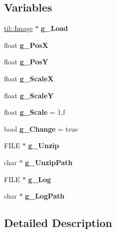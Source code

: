 \subsection*{Variables}
\begin{DoxyCompactItemize}
\item 
\hypertarget{example-zip-loading_8cpp_ad4fb9614c6143e47611a8195f8374d91}{
\hyperlink{classtil_1_1_image}{til::Image} $\ast$ {\bfseries g\_\-Load}}
\label{example-zip-loading_8cpp_ad4fb9614c6143e47611a8195f8374d91}

\item 
\hypertarget{example-zip-loading_8cpp_aa4c3fe589366d96ecc6f884f828ecd5c}{
float {\bfseries g\_\-PosX}}
\label{example-zip-loading_8cpp_aa4c3fe589366d96ecc6f884f828ecd5c}

\item 
\hypertarget{example-zip-loading_8cpp_a68b3fe0a8288876edf4b13995ab1a150}{
float {\bfseries g\_\-PosY}}
\label{example-zip-loading_8cpp_a68b3fe0a8288876edf4b13995ab1a150}

\item 
\hypertarget{example-zip-loading_8cpp_a0ccf0be757b20118e08a0f300e4e6f9d}{
float {\bfseries g\_\-ScaleX}}
\label{example-zip-loading_8cpp_a0ccf0be757b20118e08a0f300e4e6f9d}

\item 
\hypertarget{example-zip-loading_8cpp_ad5e97712b6770354bfe79b776823c41f}{
float {\bfseries g\_\-ScaleY}}
\label{example-zip-loading_8cpp_ad5e97712b6770354bfe79b776823c41f}

\item 
\hypertarget{example-zip-loading_8cpp_a85213b6988ffabd1818e30ce096a0076}{
float {\bfseries g\_\-Scale} = 1.f}
\label{example-zip-loading_8cpp_a85213b6988ffabd1818e30ce096a0076}

\item 
\hypertarget{example-zip-loading_8cpp_a5854f49c728bd0e9b6e077ce814a8e8d}{
bool {\bfseries g\_\-Change} = true}
\label{example-zip-loading_8cpp_a5854f49c728bd0e9b6e077ce814a8e8d}

\item 
\hypertarget{example-zip-loading_8cpp_abb2175306f9890df96ef1b62c63f5d69}{
FILE $\ast$ {\bfseries g\_\-Unzip}}
\label{example-zip-loading_8cpp_abb2175306f9890df96ef1b62c63f5d69}

\item 
\hypertarget{example-zip-loading_8cpp_ace5fa7dcb371fad8dfa13112dfe10ef5}{
char $\ast$ {\bfseries g\_\-UnzipPath}}
\label{example-zip-loading_8cpp_ace5fa7dcb371fad8dfa13112dfe10ef5}

\item 
\hypertarget{example-zip-loading_8cpp_ad6549b30d12da25e9b959d2eb27a0f71}{
FILE $\ast$ {\bfseries g\_\-Log}}
\label{example-zip-loading_8cpp_ad6549b30d12da25e9b959d2eb27a0f71}

\item 
\hypertarget{example-zip-loading_8cpp_ab2581e4ecda0607b6f0435150ecd8f38}{
char $\ast$ {\bfseries g\_\-LogPath}}
\label{example-zip-loading_8cpp_ab2581e4ecda0607b6f0435150ecd8f38}

\end{DoxyCompactItemize}


\subsection{Detailed Description}
